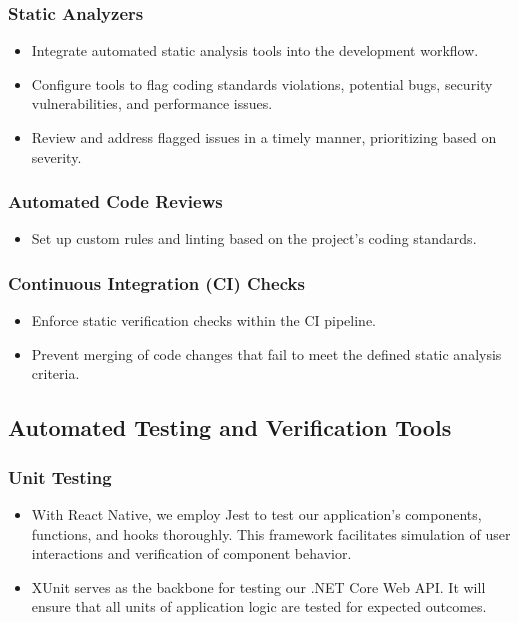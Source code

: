 \documentclass[12pt, titlepage]{article}
\begin{document}
\subsubsection{Static Analyzers}
\begin{itemize}
  \item Integrate automated static analysis tools into the development workflow.
  \item Configure tools to flag coding standards violations, potential bugs, security vulnerabilities, and performance issues.
  \item Review and address flagged issues in a timely manner, prioritizing based on severity.
\end{itemize}

\subsubsection{Automated Code Reviews}
\begin{itemize}
  \item Set up custom rules and linting based on the project’s coding standards.
\end{itemize}

\subsubsection{Continuous Integration (CI) Checks}
\begin{itemize}
  \item Enforce static verification checks within the CI pipeline.
  \item Prevent merging of code changes that fail to meet the defined static analysis criteria.
\end{itemize}

\subsection{Automated Testing and Verification Tools}

\subsubsection{Unit Testing}
\begin{itemize}
  \item With React Native, we employ Jest to test our application's components, functions, and hooks thoroughly. This framework facilitates simulation of user interactions and verification of component behavior.
  \item XUnit serves as the backbone for testing our .NET Core Web API. It will ensure that all units of application logic are tested for expected outcomes.
\end{itemize}
\end{document}
